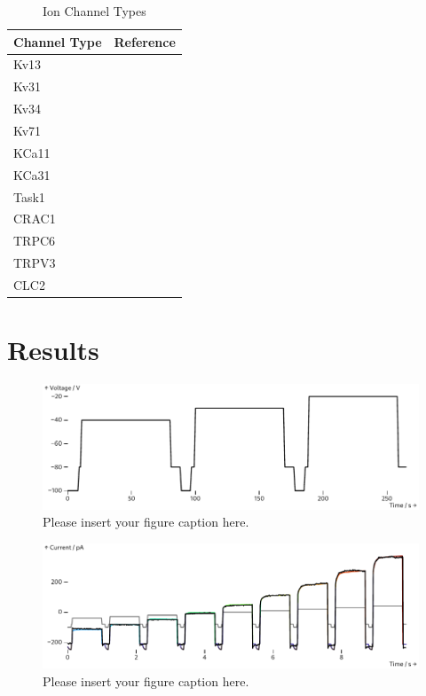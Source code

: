 \documentclass[USenglish,twocolumn]{article}
\begin{document}
  \begin{table}
    \caption{Ion Channel Types}
    \begin{tabular}{ll}
      \textbf{Channel Type} & \textbf{Reference}            \\
      \midrule
      Kv13                  & \cite{1998-potassium-channel} \\
      Kv31                  & \cite{1998-potassium-channel} \\
      Kv34                  & \cite{1998-potassium-channel} \\
      Kv71                  & \cite{1998-potassium-channel} \\
      KCa11                 & \cite{1998-potassium-channel} \\
      KCa31                 & \cite{1998-potassium-channel} \\
      Task1                 & \cite{1998-potassium-channel} \\
      CRAC1                 & \cite{1998-potassium-channel} \\
      TRPC6                 & \cite{1998-potassium-channel} \\
      TRPV3                 & \cite{1998-potassium-channel} \\
      CLC2                  & \cite{1998-potassium-channel} \\
    \end{tabular}
    \label{table:channel-types}
  \end{table}

  \section{Results}
  \begin{figure}
    \includegraphics[width=\columnwidth]{../figures/results/voltage-protocol.pdf}
    \caption{Please insert your figure caption here.}
    \label{figure:voltage-protocol}
  \end{figure}
  \begin{figure}
    \includegraphics[width=\columnwidth]{../figures/results/full-simulation-current.pdf}
    \caption{Please insert your figure caption here.}
    \label{figure:full-simulation-current}
  \end{figure}
\end{document}
